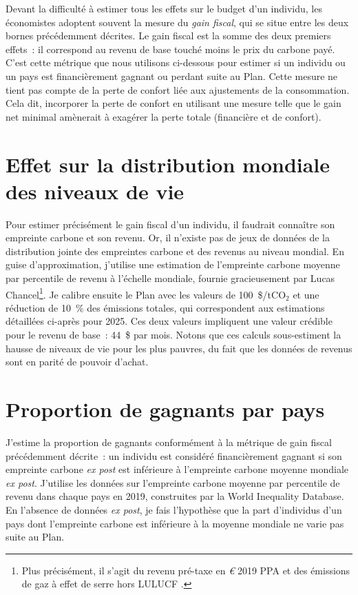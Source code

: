 \documentclass[a5paper,french,openany]{memoir}
\begin{document}
Devant la difficulté à estimer tous les effets sur le budget d'un individu, les économistes adoptent souvent la mesure du \textit{gain fiscal}, qui se situe entre les deux bornes précédemment décrites. Le gain fiscal est la somme des deux premiers effets~: il correspond au revenu de base touché moins le prix du carbone payé. C'est cette métrique que nous utilisons ci-dessous pour estimer si un individu ou un pays est financièrement gagnant ou perdant suite au Plan. Cette mesure ne tient pas compte de la perte de confort liée aux ajustements de la consommation. Cela dit, incorporer la perte de confort en utilisant une mesure %
telle que le gain net minimal amènerait à exagérer la perte totale (financière et de confort).

\section{Effet sur la distribution mondiale des niveaux de vie}\label{app:revenus}

Pour estimer précisément le gain fiscal d'un individu, il faudrait connaître son empreinte carbone et son revenu. Or, il n'existe pas de jeux de données de la distribution jointe des empreintes carbone et des revenus au niveau mondial. En guise d'approximation, j'utilise une estimation de l'empreinte carbone moyenne par percentile de revenu à l'échelle mondiale, fournie gracieusement par Lucas Chancel\footnote{Plus précisément, il s'agit du revenu pré-taxe en \textit{\euro{}} 2019 PPA et des émissions de gaz à effet de serre hors LULUCF
.}. Je calibre ensuite le Plan avec les valeurs de 100~\$/tCO$_\text{2}$ et une réduction de 10~\% des émissions totales, qui correspondent aux estimations détaillées ci-après pour 2025. Ces deux valeurs impliquent une valeur crédible pour le revenu de base~: 44~\$ par mois. Notons que ces calculs sous-estiment la hausse de niveaux de vie pour les plus pauvres, du fait que les données de revenus sont en parité de pouvoir d'achat.

\section{Proportion de gagnants par pays}

J'estime la proportion de gagnants conformément à la métrique de gain fiscal précédemment décrite~: un individu est considéré financièrement gagnant si son empreinte carbone \textit{ex post} est inférieure à l'empreinte carbone moyenne mondiale \textit{ex post}. J'utilise les données sur l'empreinte carbone moyenne par percentile de revenu dans chaque pays en 2019, construites par la World Inequality Database. En l'absence de données \textit{ex post}, je fais l'hypothèse que la part d'individus d'un pays dont l'empreinte carbone est inférieure à la moyenne mondiale ne varie pas suite au Plan.
\end{document}
